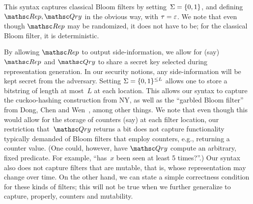 This syntax captures classical Bloom filters by setting~$\Sigma=\{0,1\}$, and defining $\Rep,\Qry$ in the obvious way, with $\tau=\varepsilon$. We note that even though $\Rep$ may be randomized, it does not have to be; for the classical Bloom filter, it is deterministic.

By allowing $\Rep$ to output side-information, we allow for (say) $\Rep$ and $\Qry$ to share a secret key selected during representation generation.  In our security notions, any side-information will be kept secret from the adversary.
%
Setting $\Sigma=\{0,1\}^{\leq L}$ allows one to store a bitstring of length at most~$L$ at each location.  This allows our syntax to capture the cuckoo-hashing construction from NY, as well as the ``garbled Bloom filter'' from Dong, Chen and Wen~\cite{xxx}, among other things. We note that even though this would allow for the storage of counters (say) at each filter location, our restriction that~$\Qry$ returns a bit does not capture functionality typically demanded of Bloom filters that employ counters, e.g., returning a counter value. (One could, however, have $\Qry$ compute an arbitrary, fixed predicate.  For example, ``has~$x$ been seen at least 5 times?''.) Our syntax also does not capture filters that are mutable, that is, whose representation may change over time. On the other hand, we can state a simple correctness condition for these kinds of filters; this will not be true when we further generalize to capture, properly, counters and mutability.
